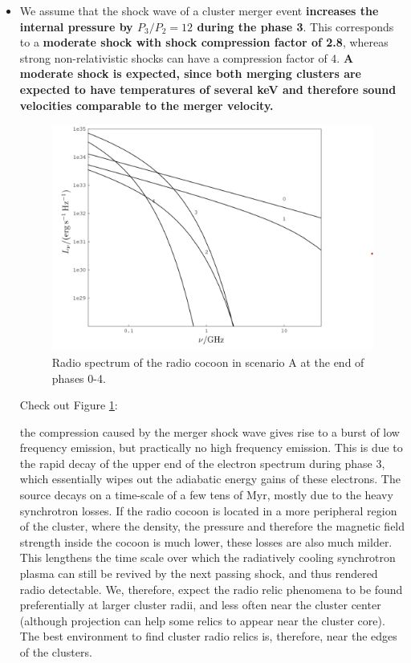 \documentclass[12pt]{report}
\newcommand{\tbf}[1]{\textbf{#1}}
\newcommand{\cbox}{tcolorbox}
\begin{document}
\begin{itemize}
\begin{itemize}
\item We assume that the shock wave of a cluster merger event \tbf{increases the internal pressure by $P_3/P_2 = 12$ during the phase 3}. This corresponds to a \tbf{moderate shock with shock compression factor of 2.8}, whereas strong non-relativistic shocks can have a compression factor of 4. \tbf{A moderate shock is expected, since both merging clusters are expected to have temperatures of several keV and therefore sound velocities comparable to the merger velocity.}
\begin{figure}[h!]\label{figsceA}
\includegraphics[scale=0.7]{figsceA.png}
\caption{Radio spectrum of the radio cocoon in scenario A at the end of phases 0-4.}
\end{figure}
Check out Figure \ref{figsceA}:
\begin{\cbox}
the compression caused by the merger shock wave gives rise to a burst of low frequency emission, but practically no high frequency emission. This is due to the rapid decay of the upper end of the electron spectrum during phase 3, which essentially wipes out the adiabatic energy gains of these electrons. The source decays on a time-scale of a few tens of Myr, mostly due to the heavy synchrotron losses. If the radio cocoon is located in a more peripheral region of the cluster, where the density, the pressure and therefore the magnetic field strength inside the cocoon is much lower, these losses are also much milder. This lengthens the time scale over which the radiatively cooling synchrotron plasma can still be revived by the next passing shock, and thus rendered radio detectable. We, therefore, expect the radio relic phenomena to be found preferentially at larger cluster radii, and less often near the cluster center (although projection can help some relics to appear near the cluster core). The best environment to find cluster radio relics is, therefore, near the edges of the clusters. 

\end{\cbox}
\end{itemize}
\end{itemize}
\end{document}
